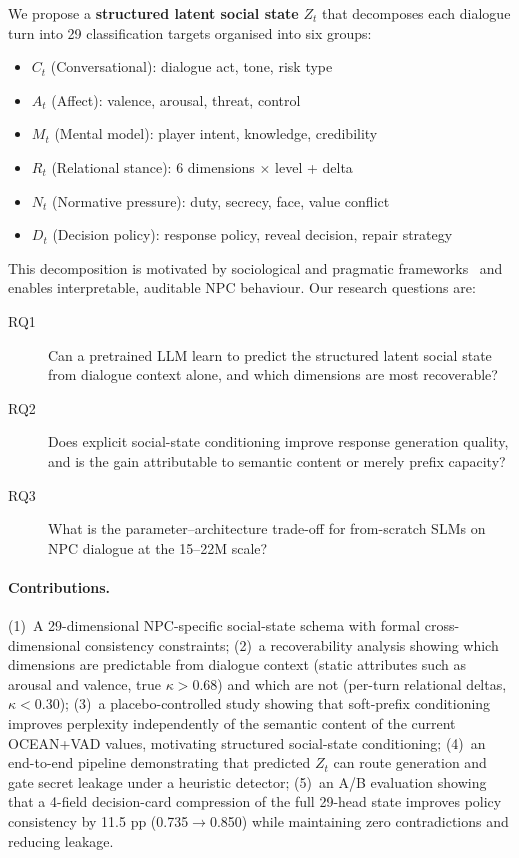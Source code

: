 \documentclass[11pt]{article}
\begin{document}
We propose a \textbf{structured latent social state} $Z_t$ that decomposes each dialogue turn into 29 classification targets organised into six groups:
\begin{itemize}
    \item \textbf{$C_t$} (Conversational): dialogue act, tone, risk type
    \item \textbf{$A_t$} (Affect): valence, arousal, threat, control
    \item \textbf{$M_t$} (Mental model): player intent, knowledge, credibility
    \item \textbf{$R_t$} (Relational stance): 6 dimensions $\times$ level + delta
    \item \textbf{$N_t$} (Normative pressure): duty, secrecy, face, value conflict
    \item \textbf{$D_t$} (Decision policy): response policy, reveal decision, repair strategy
\end{itemize}

This decomposition is motivated by sociological and pragmatic frameworks~\cite{brown1987politeness,oatley1987towards,spencer2008politeness} and enables interpretable, auditable NPC behaviour.
Our research questions are:

\begin{description}
    \item[RQ1] Can a pretrained LLM learn to predict the structured latent social state from dialogue context alone, and which dimensions are most recoverable?
    \item[RQ2] Does explicit social-state conditioning improve response generation quality, and is the gain attributable to semantic content or merely prefix capacity?
    \item[RQ3] What is the parameter--architecture trade-off for from-scratch SLMs on NPC dialogue at the 15--22M scale?
\end{description}

\paragraph{Contributions.}
(1)~A 29-dimensional NPC-specific social-state schema with formal cross-dimensional consistency constraints;
(2)~a recoverability analysis showing which dimensions are predictable from dialogue context (static attributes such as arousal and valence, true $\kappa{>}0.68$) and which are not (per-turn relational deltas, $\kappa{<}0.30$);
(3)~a placebo-controlled study showing that soft-prefix conditioning improves perplexity independently of the semantic content of the current OCEAN+VAD values, motivating structured social-state conditioning;
(4)~an end-to-end pipeline demonstrating that predicted $Z_t$ can route generation and gate secret leakage under a heuristic detector;
(5)~an A/B evaluation showing that a 4-field decision-card compression of the full 29-head state improves policy consistency by 11.5 pp (0.735$\to$0.850) while maintaining zero contradictions and reducing leakage.
\end{document}
